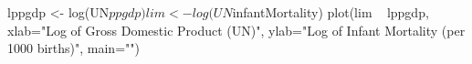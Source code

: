 \begin{Schunk}
\begin{Sinput}
 lppgdp <- log(UN$ppgdp)
 lim <- log(UN$infantMortality)
 plot(lim ~ lppgdp, xlab="Log of Gross Domestic Product (UN)", ylab="Log of Infant Mortality (per 1000 births)", main="")
\end{Sinput}
\end{Schunk}
